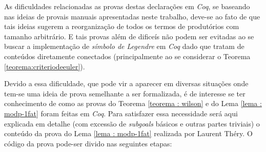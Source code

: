 As dificuldades relacionadas as provas destas declarações em \textit{Coq}, se baseando nas ideias de provais manuais apresentadas neste trabalho, deve-se ao fato de que tais ideias sugerem a reorganização de todos os termos de produtórios com tamanho arbitrário. E tais provas além de dificeís não podem ser evitadas ao se buscar a implementação de \textit{símbolo de Legendre} em \textit{Coq} dado que tratam de conteúdos diretamente conectados (principalmente ao se considerar o Teorema \ref{teorema:criteriodeeuler}).

Devido a essa dificuldade, que pode vir a aparecer em diversas situações onde tem-se uma ideia de prova semelhante a ser formalizada, é de interesse se ter conhecimento de como as provas do Teorema \ref{teorema : wilson} e do Lema \ref{lema : modp-1fat} foram feitas em \textit{Coq}. Para satisfazer essa necessidade será aqui explicada em detalhe (com excessão de \textit{subgoals} básicos e outras partes triviais) o conteúdo da prova do Lema \ref{lema : modp-1fat} realizada por Laurent Théry. O código da prova pode-ser divido nas seguintes etapas:

